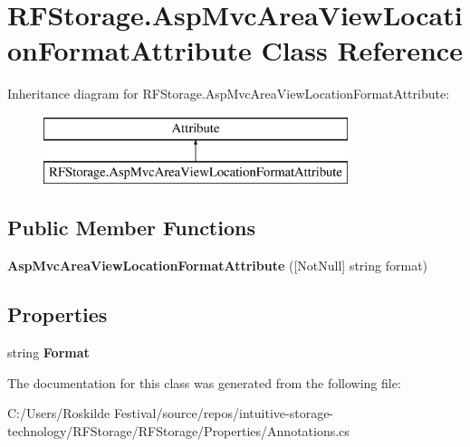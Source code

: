 \hypertarget{class_r_f_storage_1_1_asp_mvc_area_view_location_format_attribute}{}\section{R\+F\+Storage.\+Asp\+Mvc\+Area\+View\+Location\+Format\+Attribute Class Reference}
\label{class_r_f_storage_1_1_asp_mvc_area_view_location_format_attribute}
Inheritance diagram for R\+F\+Storage.\+Asp\+Mvc\+Area\+View\+Location\+Format\+Attribute\+:\begin{figure}[H]
\begin{center}
\leavevmode
\includegraphics[height=2.000000cm]{class_r_f_storage_1_1_asp_mvc_area_view_location_format_attribute}
\end{center}
\end{figure}
\subsection*{Public Member Functions}
\begin{DoxyCompactItemize}
\item 
\mbox{\label{class_r_f_storage_1_1_asp_mvc_area_view_location_format_attribute_a41ea3037429c25a152f1486081552202}} 
{\bfseries Asp\+Mvc\+Area\+View\+Location\+Format\+Attribute} (\mbox{[}Not\+Null\mbox{]} string format)
\end{DoxyCompactItemize}
\subsection*{Properties}
\begin{DoxyCompactItemize}
\item 
\mbox{\label{class_r_f_storage_1_1_asp_mvc_area_view_location_format_attribute_a14939f37da9e71cf6d333976fb5594bf}} 
string {\bfseries Format}
\end{DoxyCompactItemize}


The documentation for this class was generated from the following file\+:\begin{DoxyCompactItemize}
\item 
C\+:/\+Users/\+Roskilde Festival/source/repos/intuitive-\/storage-\/technology/\+R\+F\+Storage/\+R\+F\+Storage/\+Properties/Annotations.\+cs\end{DoxyCompactItemize}
